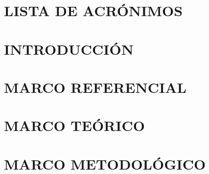 \documentclass[letterpaper,titlepage,12pt,oneside,spanish,final]{report_eie}
\begin{document}
%
\thispagestyle{empty}%
\renewcommand{\baselinestretch}{1.5}%
\addtocounter{page}{3}%
\setlength{\parskip}{3pt}%

\tableofcontents%

\listoffigures%

\listoftables%


\chapter*{LISTA DE ACRÓNIMOS}%
%
%


\chapter*{INTRODUCCIÓN}\label{CAP:intro}
\setlength{\parskip}{14pt}%
%

%
%

\chapter{MARCO REFERENCIAL}\label{CAP:referencial}
%

\chapter{MARCO TEÓRICO}\label{CAP:marco_teor}
%

\chapter{MARCO METODOLÓGICO}\label{CAP:marco_met}
%
\end{document}
